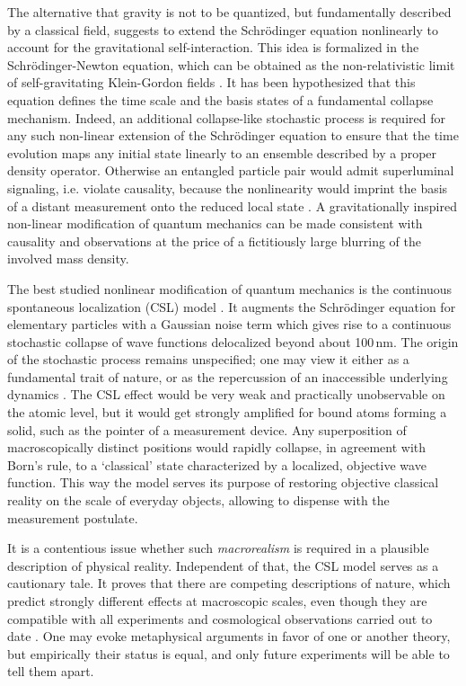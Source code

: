 \documentclass[12pt]{article}
\begin{document}
The alternative that gravity is not to be quantized, but fundamentally described by a classical field, suggests to extend the Schr\"odinger equation nonlinearly to account for the gravitational self-interaction\cite{Bassi2012,PhysRevLett.110.170401}.
This idea is formalized in the Schr\"odinger-Newton equation, which can be obtained as the non-relativistic limit of self-gravitating Klein-Gordon fields \cite{Giulini2012}. 
It has been hypothesized that this equation defines the time scale and the basis states of a fundamental collapse mechanism. 
Indeed, an additional collapse-like stochastic process is required for any such non-linear extension of the Schr\"odinger equation to ensure that the time evolution maps any initial state linearly to an ensemble described by a proper density operator. Otherwise an entangled particle pair  would admit superluminal signaling, i.e. violate causality, because the nonlinearity would imprint the basis of a distant measurement onto the reduced local state \cite{gisin1989stochastic}. A gravitationally inspired non-linear modification of quantum mechanics\cite{diosi1987universal} can be made consistent with causality and observations at the price of a fictitiously large blurring of the involved mass density\cite{Bassi2012}.

The best studied nonlinear modification of quantum mechanics is the continuous spontaneous localization (CSL) model \cite{GPR1990,Bassi2003}. It augments the Schr\"odinger equation for elementary particles with a Gaussian noise term which gives rise to a continuous stochastic collapse of wave functions delocalized beyond about 100\,nm.
The origin of the stochastic process remains unspecified; one may view it either as a fundamental trait of nature, or as the repercussion of an inaccessible underlying dynamics
\cite{Adler2004}.
The CSL effect would be very weak and practically unobservable on the atomic level, but
it would get strongly amplified 
for bound atoms forming a solid, such as the pointer of a measurement device. Any superposition of macroscopically distinct positions would rapidly collapse, in agreement with Born's rule, to a `classical' state characterized by a localized, objective wave function.
This way the model serves its purpose of restoring objective classical reality on the scale of everyday objects,
allowing to dispense with the measurement postulate.

It is a contentious issue whether  such \emph{macrorealism} \cite{Leggett2002} is required in a plausible description of physical reality. Independent of that,  the CSL model 
serves as a cautionary tale.
It proves that there are competing descriptions of nature,
which predict strongly different effects at macroscopic scales, 
even though they are compatible with all experiments and cosmological observations carried out to date \cite{Feldmann2012,Bassi2012}. One may evoke metaphysical arguments in favor of one or another theory, but empirically their status is equal, and only future experiments will be able to tell them apart.
\end{document}
